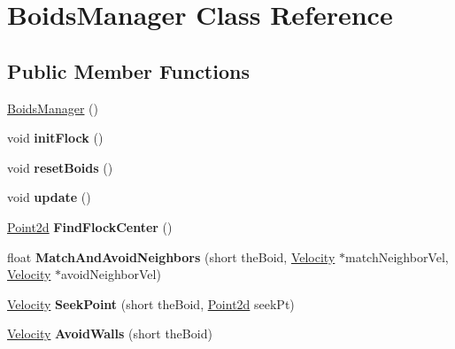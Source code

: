 \hypertarget{class_boids_manager}{\section{Boids\-Manager Class Reference}
\label{class_boids_manager}
}
\subsection*{Public Member Functions}
\begin{DoxyCompactItemize}
\item 
\hyperlink{class_boids_manager_aa0e85ff06c7c9912b3f22673fb99d837}{Boids\-Manager} ()
\item 
\hypertarget{class_boids_manager_a17be98b043bf439bfb10a9f300308e35}{void {\bfseries init\-Flock} ()}\label{class_boids_manager_a17be98b043bf439bfb10a9f300308e35}

\item 
\hypertarget{class_boids_manager_a6f4b1b6a060c865b4188b643cc66d284}{void {\bfseries reset\-Boids} ()}\label{class_boids_manager_a6f4b1b6a060c865b4188b643cc66d284}

\item 
\hypertarget{class_boids_manager_a16183cc1c98ffc366649a3ce477d298f}{void {\bfseries update} ()}\label{class_boids_manager_a16183cc1c98ffc366649a3ce477d298f}

\item 
\hypertarget{class_boids_manager_a69f0d046aeeb6db1679a040e4e913008}{\hyperlink{struct_point2d}{Point2d} {\bfseries Find\-Flock\-Center} ()}\label{class_boids_manager_a69f0d046aeeb6db1679a040e4e913008}

\item 
\hypertarget{class_boids_manager_af272d7d0716735458776acf48b78222e}{float {\bfseries Match\-And\-Avoid\-Neighbors} (short the\-Boid, \hyperlink{struct_velocity}{Velocity} $\ast$match\-Neighbor\-Vel, \hyperlink{struct_velocity}{Velocity} $\ast$avoid\-Neighbor\-Vel)}\label{class_boids_manager_af272d7d0716735458776acf48b78222e}

\item 
\hypertarget{class_boids_manager_accb5827c74c27972be0a1b4560bb6a3f}{\hyperlink{struct_velocity}{Velocity} {\bfseries Seek\-Point} (short the\-Boid, \hyperlink{struct_point2d}{Point2d} seek\-Pt)}\label{class_boids_manager_accb5827c74c27972be0a1b4560bb6a3f}

\item 
\hypertarget{class_boids_manager_a91f17d1297bcf1322fe57b6928b866b0}{\hyperlink{struct_velocity}{Velocity} {\bfseries Avoid\-Walls} (short the\-Boid)}\label{class_boids_manager_a91f17d1297bcf1322fe57b6928b866b0}


\end{DoxyCompactItemize}

